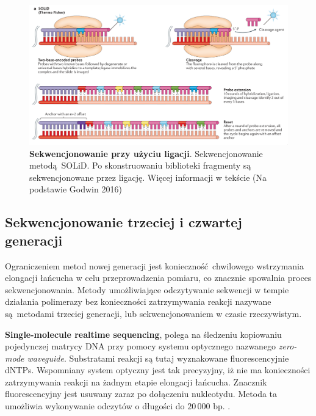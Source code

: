\documentclass[two column, twoside, a4paper]{article}
\begin{document}
\begin{figure}[btp]
	\begin{tcolorbox}
		\centering
		\includegraphics[width=\textwidth]{./figury/solid.png}
		\caption{\textbf{Sekwencjonowanie przy użyciu ligacji}. Sekwencjonowanie metodą SOLiD. Po skonstruowaniu biblioteki fragmenty są sekwencjonowane przez ligację. Więcej informacji w tekście (Na podstawie Godwin 2016)}\label{fig::solid}
	\end{tcolorbox}
\end{figure}

\subsection{Sekwencjonowanie trzeciej i czwartej\\ generacji}

Ograniczeniem metod nowej generacji jest konieczność chwilowego wstrzymania elongacji łańcucha w celu przeprowadzenia pomiaru, co znacznie spowalnia proces sekwencjonowania. Metody umożliwiające odczytywanie sekwencji w tempie działania polimerazy bez konieczności zatrzymywania reakcji nazywane są metodami trzeciej generacji, lub sekwencjonowaniem w czasie rzeczywistym.

\textbf{Single-molecule realtime sequencing}, polega na śledzeniu kopiowaniu pojedynczej matrycy DNA przy pomocy systemu optycznego nazwanego \textit{zero-mode waveguide}. Substratami reakcji są tutaj wyznakowane fluorescencyjnie dNTPs. Wspomniany system optyczny jest tak precyzyjny, iż nie ma konieczności zatrzymywania reakcji na żadnym etapie elongacji łańcucha.  Znacznik fluorescencyjny jest usuwany zaraz po dołączeniu nukleotydu. Metoda ta umożliwia wykonywanie odczytów o długości do $20\,000$ bp. \autocite{Brown2019}.
\end{document}
